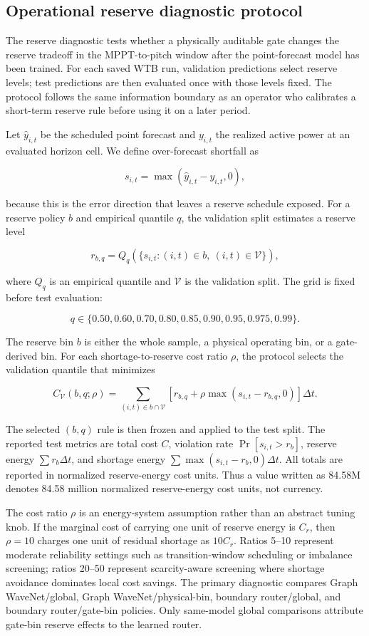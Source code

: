 \documentclass[
  11pt]{article}
\begin{document}
\subsection{Operational reserve diagnostic
protocol}\label{operational-reserve-diagnostic-protocol}

The reserve diagnostic tests whether a physically auditable gate changes
the reserve tradeoff in the MPPT-to-pitch window after the
point-forecast model has been trained. For each saved WTB run,
validation predictions select reserve levels; test predictions are then
evaluated once with those levels fixed. The protocol follows the same
information boundary as an operator who calibrates a short-term reserve
rule before using it on a later period.

Let \(\hat{y}_{i,t}\) be the scheduled point forecast and \(y_{i,t}\)
the realized active power at an evaluated horizon cell. We define
over-forecast shortfall as

\[
s_{i,t} = \max(\hat{y}_{i,t} - y_{i,t}, 0),
\]

because this is the error direction that leaves a reserve schedule
exposed. For a reserve policy \(b\) and empirical quantile \(q\), the
validation split estimates a reserve level

\[
r_{b,q} = Q_q\!\left(\{s_{i,t}: (i,t)\in b,\ (i,t)\in \mathcal{V}\}\right),
\]

where \(Q_q\) is an empirical quantile and \(\mathcal{V}\) is the
validation split. The grid is fixed before test evaluation:

\[
q \in \{0.50,0.60,0.70,0.80,0.85,0.90,0.95,0.975,0.99\}.
\]

The reserve bin \(b\) is either the whole sample, a physical operating
bin, or a gate-derived bin. For each shortage-to-reserve cost ratio
\(\rho\), the protocol selects the validation quantile that minimizes

\[
C_{\mathcal{V}}(b,q;\rho)
=
\sum_{(i,t)\in b\cap \mathcal{V}}
\left[
r_{b,q} + \rho \max(s_{i,t}-r_{b,q},0)
\right]\Delta t.
\]

The selected \((b,q)\) rule is then frozen and applied to the test
split. The reported test metrics are total cost \(C\), violation rate
\(\Pr[s_{i,t}>r_b]\), reserve energy \(\sum r_b\Delta t\), and shortage
energy \(\sum \max(s_{i,t}-r_b,0)\Delta t\). All totals are reported in
normalized reserve-energy cost units. Thus a value written as 84.58M
denotes 84.58 million normalized reserve-energy cost units, not
currency.

The cost ratio \(\rho\) is an energy-system assumption rather than an
abstract tuning knob. If the marginal cost of carrying one unit of
reserve energy is \(C_r\), then \(\rho=10\) charges one unit of residual
shortage as \(10C_r\). Ratios 5--10 represent moderate reliability
settings such as transition-window scheduling or imbalance screening;
ratios 20--50 represent scarcity-aware screening where shortage
avoidance dominates local cost savings. The primary diagnostic compares
Graph WaveNet/global, Graph WaveNet/physical-bin, boundary
router/global, and boundary router/gate-bin policies. Only same-model
global comparisons attribute gate-bin reserve effects to the learned
router.
\end{document}

